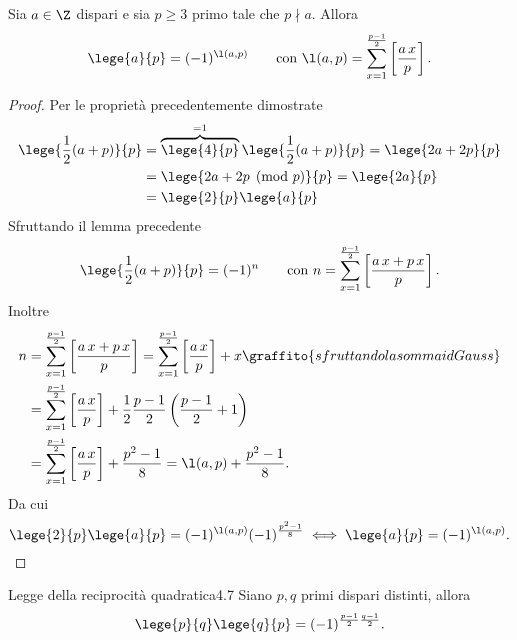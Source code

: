 \begin{lem}
	Sia \(a\in\Z\) dispari e sia \(p\ge 3\) primo tale che \(p\nmid a\).
	Allora
	\[
		\lege{a}{p} = (-1)^{\l(a,p)} \qquad\text{con } \l(a,p) = \sum_{x=1}^{\frac{p-1}{2}} \left[ \frac{a\,x}{p} \right].
	\]
\end{lem}

\begin{proof}
	Per le proprietà precedentemente dimostrate
	\[
		\begin{split}
			\lege{\frac{1}{2}(a+p)}{p} & = \overbrace{\lege{4}{p}}^{=1} \lege{\frac{1}{2}(a+p)}{p} = \lege{2a+2p}{p}\\
			& = \lege{2a+2p\pmod{p}}{p} = \lege{2a}{p}\\
			& = \lege{2}{p}\lege{a}{p}
		\end{split}
	\]
	Sfruttando il lemma precedente
	\[
		\lege{\frac{1}{2}(a+p)}{p} = (-1)^n \qquad\text{con }n = \sum_{x=1}^{\frac{p-1}{2}} \left[ \frac{a\,x+p\,x}{p} \right].
	\]
	Inoltre
	\[
		\begin{split}
			n & = \sum_{x=1}^{\frac{p-1}{2}} \left[ \frac{a\,x+p\,x}{p} \right] = \sum_{x=1}^{\frac{p-1}{2}} \left[ \frac{a\,x}{p} \right] +x\graffito{sfruttando la somma id Gauss}\\
			& = \sum_{x=1}^{\frac{p-1}{2}} \left[ \frac{a\,x}{p} \right] + \frac{1}{2}\frac{p-1}{2}\left( \frac{p-1}{2}+1 \right)\\
			& = \sum_{x=1}^{\frac{p-1}{2}} \left[ \frac{a\,x}{p} \right] + \frac{p^2-1}{8} = \l(a,p) + \frac{p^2-1}{8}.
		\end{split}
	\]
	Da cui
	\[
		\lege{2}{p}\lege{a}{p} = (-1)^{\l(a,p)} (-1)^{\frac{p^2-1}{8}} \iff \lege{a}{p} = (-1)^{\l(a,p)}.\qedhere
	\]
\end{proof}

\begin{teor}{Legge della reciprocità quadratica}{4.7}
	Siano \(p,q\) primi dispari distinti, allora
	\[
		\lege{p}{q}\lege{q}{p} = (-1)^{\frac{p-1}{2}\frac{q-1}{2}}.
	\]
\end{teor}

